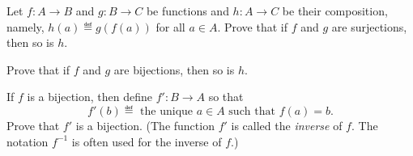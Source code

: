 \begin{pcomments}
\end{pcomments}



\begin{problem}
  Let $f:A \to B$ and $g: B \to C$ be functions and $h:A \to C$ be their
  composition, namely, $h(a) \eqdef g(f(a))$ for all $a \in A$.
\bparts
  \ppart Prove that if $f$ and $g$ are surjections, then so is $h$.

  \ppart Prove that if $f$ and $g$ are bijections, then so is $h$.

  \ppart If $f$ is a bijection, then define $f':B \to A$ so that
  \[
  f'(b) \eqdef\text{ the unique } a \in A \text{ such that } f(a)=b.
  \]
  Prove that $f'$ is a bijection.  (The function $f'$ is called the
  \emph{inverse} of $f$.  The notation $f^{-1}$ is often used for the
  inverse of $f$.)
\eparts


\end{problem}


\endinput
